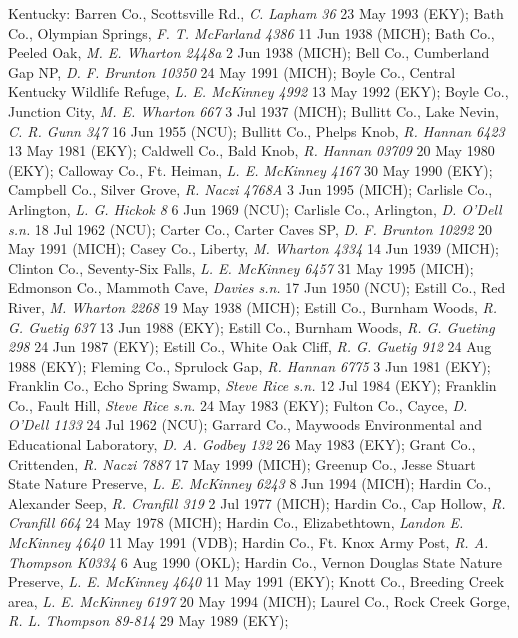 \documentclass{article}
\begin{document}
Kentucky:
Barren Co., Scottsville Rd., \textit{C. Lapham 36} 23 May 1993 (EKY);
Bath Co., Olympian Springs, \textit{F. T. McFarland 4386} 11 Jun 1938 (MICH);
Bath Co., Peeled Oak, \textit{M. E. Wharton 2448a} 2 Jun 1938 (MICH);
Bell Co., Cumberland Gap NP, \textit{D. F. Brunton 10350} 24 May 1991 (MICH);
Boyle Co., Central Kentucky Wildlife Refuge, \textit{L. E. McKinney 4992} 13 May 1992 (EKY);
Boyle Co., Junction City, \textit{M. E. Wharton 667} 3 Jul 1937 (MICH);
Bullitt Co., Lake Nevin, \textit{C. R. Gunn 347} 16 Jun 1955 (NCU);
Bullitt Co., Phelps Knob, \textit{R. Hannan 6423} 13 May 1981 (EKY);
Caldwell Co., Bald Knob, \textit{R. Hannan 03709} 20 May 1980 (EKY);
Calloway Co., Ft. Heiman, \textit{L. E. McKinney 4167} 30 May 1990 (EKY);
Campbell Co., Silver Grove, \textit{R. Naczi 4768A} 3 Jun 1995 (MICH);
Carlisle Co., Arlington, \textit{L. G. Hickok 8} 6 Jun 1969 (NCU);
Carlisle Co., Arlington, \textit{D. O'Dell s.n.} 18 Jul 1962 (NCU);
Carter Co., Carter Caves SP, \textit{D. F. Brunton 10292} 20 May 1991 (MICH);
Casey Co., Liberty, \textit{M. Wharton 4334} 14 Jun 1939 (MICH);
Clinton Co., Seventy-Six Falls, \textit{L. E. McKinney 6457} 31 May 1995 (MICH);
Edmonson Co., Mammoth Cave, \textit{Davies s.n.} 17 Jun 1950 (NCU);
Estill Co., Red River, \textit{M. Wharton 2268} 19 May 1938 (MICH);
Estill Co., Burnham Woods, \textit{R. G. Guetig 637} 13 Jun 1988 (EKY);
Estill Co., Burnham Woods, \textit{R. G. Gueting 298} 24 Jun 1987 (EKY);
Estill Co., White Oak Cliff, \textit{R. G. Guetig 912} 24 Aug 1988 (EKY);
Fleming Co., Sprulock Gap, \textit{R. Hannan 6775} 3 Jun 1981 (EKY);
Franklin Co., Echo Spring Swamp, \textit{Steve Rice s.n.} 12 Jul 1984 (EKY);
Franklin Co., Fault Hill, \textit{Steve Rice s.n.} 24 May 1983 (EKY);
Fulton Co., Cayce, \textit{D. O'Dell 1133} 24 Jul 1962 (NCU);
Garrard Co., Maywoods Environmental and Educational Laboratory, \textit{D. A. Godbey 132} 26 May 1983 (EKY);
Grant Co., Crittenden, \textit{R. Naczi 7887} 17 May 1999 (MICH);
Greenup Co., Jesse Stuart State Nature Preserve, \textit{L. E. McKinney 6243} 8 Jun 1994 (MICH);
Hardin Co., Alexander Seep, \textit{R. Cranfill 319} 2 Jul 1977 (MICH);
Hardin Co., Cap Hollow, \textit{R. Cranfill 664} 24 May 1978 (MICH);
Hardin Co., Elizabethtown, \textit{Landon E. McKinney 4640} 11 May 1991 (VDB);
Hardin Co., Ft. Knox Army Post, \textit{R. A. Thompson K0334} 6 Aug 1990 (OKL);
Hardin Co., Vernon Douglas State Nature Preserve, \textit{L. E. McKinney 4640} 11 May 1991 (EKY);
Knott Co., Breeding Creek area, \textit{L. E. McKinney 6197} 20 May 1994 (MICH);
Laurel Co., Rock Creek Gorge, \textit{R. L. Thompson 89-814} 29 May 1989 (EKY);
\end{document}
